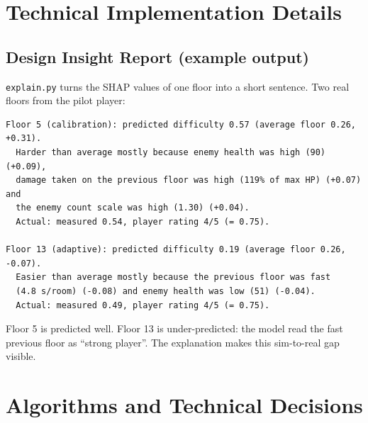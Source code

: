 \section{Technical Implementation Details}
\subsection{Design Insight Report (example output)}
\texttt{explain.py} turns the SHAP values of one floor into a short sentence. Two real floors from the pilot player:
\begin{lstlisting}[caption={Design Insight Report for two real floors (pilot player)}, label={lst:insight}]
Floor 5 (calibration): predicted difficulty 0.57 (average floor 0.26, +0.31).
  Harder than average mostly because enemy health was high (90) (+0.09),
  damage taken on the previous floor was high (119% of max HP) (+0.07) and
  the enemy count scale was high (1.30) (+0.04).
  Actual: measured 0.54, player rating 4/5 (= 0.75).

Floor 13 (adaptive): predicted difficulty 0.19 (average floor 0.26, -0.07).
  Easier than average mostly because the previous floor was fast
  (4.8 s/room) (-0.08) and enemy health was low (51) (-0.04).
  Actual: measured 0.49, player rating 4/5 (= 0.75).
\end{lstlisting}
Floor 5 is predicted well. Floor 13 is under-predicted: the model read the fast previous floor as ``strong player''. The explanation makes this sim-to-real gap visible.

\section{Algorithms and Technical Decisions}

